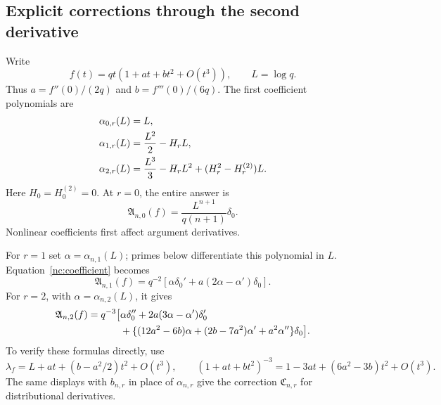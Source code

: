 \documentclass[11pt,a4paper]{article}
\numberwithin{equation}{section}
\theoremstyle{definition}
\theoremstyle{remark}
\begin{document}
\subsection{Explicit corrections through the second derivative}

Write
\begin{equation}\label{nc:f-expansion}
 f(t)=qt(1+a t+b t^2+O(t^3)),\qquad L=\log q.
\end{equation}
Thus $a=f''(0)/(2q)$ and $b=f'''(0)/(6q)$. The first coefficient
polynomials are
\begin{align}
 \alpha_{0,r}(L)&=L,\notag\\
 \alpha_{1,r}(L)&=\frac{L^2}{2}-H_rL,\label{nc:first-alpha}\\
 \alpha_{2,r}(L)&=\frac{L^3}{3}-H_rL^2
                    +(H_r^2-H_r^{(2)})L.\notag
\end{align}
Here $H_0=H_0^{(2)}=0$. At $r=0$, the entire answer is
\begin{equation}\label{nc:undifferentiated}
 \mathfrak A_{n,0}(f)=\frac{L^{n+1}}{q(n+1)}\delta_0.
\end{equation}
Nonlinear coefficients first affect argument derivatives.

For $r=1$ set $\alpha=\alpha_{n,1}(L)$; primes below differentiate
this polynomial in $L$. Equation~\eqref{nc:coefficient} becomes
\begin{equation}\label{nc:r1}
 \mathfrak A_{n,1}(f)
  =q^{-2}\left[\alpha\delta_0'
                   +a(2\alpha-\alpha')\delta_0\right].
\end{equation}
For $r=2$, with $\alpha=\alpha_{n,2}(L)$, it gives
\begin{align}\label{nc:r2}
 \mathfrak A_{n,2}(f)=q^{-3}\bigl[&\alpha\delta_0''
       +2a(3\alpha-\alpha')\delta_0'\notag\\
       &+\{(12a^2-6b)\alpha+(2b-7a^2)\alpha'
                                      +a^2\alpha''\}\delta_0\bigr].
\end{align}
To verify these formulas directly, use
\[
 \lambda_f=L+a t+(b-a^2/2)t^2+O(t^3),\qquad
 (1+a t+b t^2)^{-3}
      =1-3a t+(6a^2-3b)t^2+O(t^3).
\]
The same displays with $b_{n,r}$ in place of $\alpha_{n,r}$ give the
correction $\mathfrak C_{n,r}$ for distributional derivatives.
\end{document}
